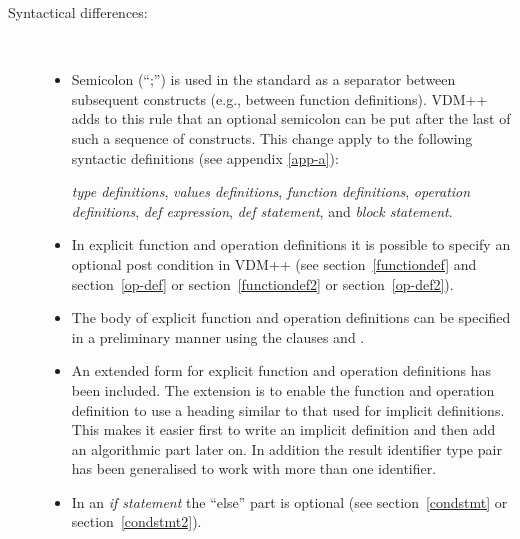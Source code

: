 \documentclass[\pformat,12pt]{article}
\newcommand{\vdmslpp}[2]{%
#2
}
\newcommand{\vdmsl}{VDM-SL}
\newcommand{\vdmpp}{VDM++}
\begin{document}
\begin{description}
\item[Syntactical differences:]\mbox{}\\
  \begin{itemize}
  
  \item Semicolon (``;'') is used in the standard as a separator
    between subsequent constructs (e.g., between function
    definitions).  \vdmslpp{\vdmsl}{\vdmpp} adds to this rule that
    an optional semicolon can be put after the last of such a sequence
    of constructs. This change apply to the following syntactic
    definitions (see appendix \ref{app-a}): \vdmslpp{{\em state
    definition},}{} {\em type definitions}, {\em values definitions},
    {\em function definitions}, {\em operation definitions}, {\em def
    expression}, {\em def statement}, and {\em block statement}.

  \item In explicit function and operation definitions it is possible
    to specify an optional post condition in 
    \vdmslpp{VDM-SL}{\vdmpp} (see section~\ref{functiondef} and
    section~\ref{op-def} or section~\ref{functiondef2} or
    section~\ref{op-def2}).

  \item The body of explicit function and operation definitions can be
    specified in a preliminary manner using the \vdmslpp{clause}{clauses
     and} .

    
  \item An extended form for explicit function and operation
    definitions has been included. The extension is to enable the
    function and operation definition to use a heading similar to that
    used for implicit definitions. This makes it easier first to write
    an implicit definition and then add an algorithmic part later
    on. In addition the result identifier type pair has been
    generalised to work with more than one identifier.


  \item In an {\it if statement\/} the ``else'' part is optional (see
        section~\ref{condstmt} or section~\ref{condstmt2}).
        

\end{itemize}
\end{description}
\end{document}
